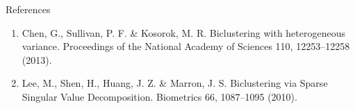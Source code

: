 \documentclass{beamer}
\begin{document}
\begin{frame}[label=end, standout]
\end{frame}

\begin{frame}{References}
  \begin{enumerate}
    \item Chen, G., Sullivan, P. F. \& Kosorok, M. R. Biclustering with
      heterogeneous variance. Proceedings of the National Academy of Sciences
      110, 12253–12258 (2013).
    \item Lee, M., Shen, H., Huang, J. Z. \& Marron, J. S. Biclustering via
      Sparse Singular Value Decomposition. Biometrics 66, 1087–1095 (2010).
  \end{enumerate}
\end{frame}
\end{document}
